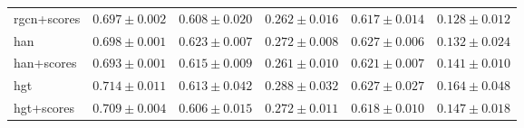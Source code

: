\begin{table}[t]
\begin{tabular}{lccccc}
rgcn+scores & $0.697 \pm 0.002$ & $0.608 \pm 0.020$ & $0.262 \pm 0.016$ & $0.617 \pm 0.014$ & $0.128 \pm 0.012$ \\
han & $0.698 \pm 0.001$ & $0.623 \pm 0.007$ & $0.272 \pm 0.008$ & $0.627 \pm 0.006$ & $0.132 \pm 0.024$ \\
han+scores & $0.693 \pm 0.001$ & $0.615 \pm 0.009$ & $0.261 \pm 0.010$ & $0.621 \pm 0.007$ & $0.141 \pm 0.010$ \\
hgt & $0.714 \pm 0.011$ & $0.613 \pm 0.042$ & $0.288 \pm 0.032$ & $0.627 \pm 0.027$ & $0.164 \pm 0.048$ \\
hgt+scores & $0.709 \pm 0.004$ & $0.606 \pm 0.015$ & $0.272 \pm 0.011$ & $0.618 \pm 0.010$ & $0.147 \pm 0.018$ \\
\bottomrule
\end{tabular}
\end{table}
